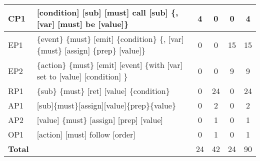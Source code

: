 \begin{table}[t]
\begin{tabular}{|l|p{}|c|c|c|c|}
    CP1 & [condition] [sub] [must] call [sub] \{, [var] [must] be [value]\}       & 4   & 0 & 0   & 4    \\ \hline
    EP1 & \{event\} \{must\} [emit] \{condition\} \{, [var] \{must\} [assign] \{prep\} [value]\}                      & 0   & 0 &  15   &     15    \\ \hline
    EP2 & \{action\} \{must\} [emit] [event] \{with [var] set to [value] [condition] \}                      & 0   & 0 &  9  & 9         \\ \hline
    RP1 & \{sub\} \{must\} [ret] [value] \{condition\}                                  &  0  & 24 & 0&   24     \\ \hline
    AP1 & [sub]\{must\}[assign][value]\{prep\}\{value\}            & 0 & 2 & 0 &  2        \\ \hline
    AP2 & [value] \{must\} [assign] [prep] [value]            & 0 & 1 & 0 &  1        \\ \hline
    OP1 & [action] [must] follow [order]                 & 0 & 1 & 0 &  1        \\ \hline \hline

    
{\textbf{Total}}  &  & 24 &  42 &  24 & 90 \\ \hline 
\end{tabular}
\end{table}